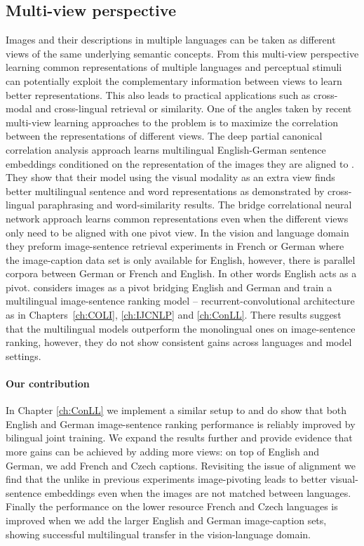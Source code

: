 \subsection{Multi-view perspective}
\label{sec:multiview}

Images and their descriptions in multiple languages can be taken as different views of the
same underlying semantic concepts. From this multi-view perspective learning common representations
of multiple languages and perceptual stimuli can potentially exploit the complementary information
between views to learn better representations. This also leads to practical applications such as
cross-modal and cross-lingual retrieval or similarity.
One of the angles taken by recent multi-view learning approaches to the problem
is to maximize the correlation between the representations of different views.
The deep partial canonical correlation
analysis approach learns multilingual English-German sentence embeddings conditioned on the
representation of the images they are aligned to \citep{rotman2018bridging}.
They show that their model using the visual modality as an extra view finds
better multilingual sentence and word representations as demonstrated by
cross-lingual paraphrasing and word-similarity results.
The bridge correlational neural network approach \citep{rajendran2015bridge}
learns common representations even when the different views only need to be
aligned with one pivot view. In the vision and language domain they preform
image-sentence retrieval experiments in French or German where
the image-caption data set is only available for English, however,
there is parallel corpora between German or French and English. In other words English acts as a pivot.
\cite{gella2017image} considers images as a pivot bridging English and German and train a multilingual
image-sentence ranking model -- recurrent-convolutional architecture as in Chapters~\ref{ch:COLI}, \ref{ch:IJCNLP} and \ref{ch:ConLL}.
There results suggest that the multilingual models outperform the monolingual ones on image-sentence
ranking, however, they do not show consistent gains across languages and model settings.

\paragraph{Our contribution}

In Chapter \ref{ch:ConLL} we implement a similar setup to \cite{gella2017image}
and do show that both English and German image-sentence
ranking performance is reliably improved by bilingual joint training.
We expand the results further and provide evidence that more gains can be
achieved by adding more views: on top of English and German, we
add French and Czech captions. Revisiting the issue of alignment we find that
the unlike in previous experiments \citep{gella2017image,calixto2017multilingual,rotman2018bridging}
image-pivoting leads to better visual-sentence embeddings even when the images
are not matched between languages. Finally the performance on the lower resource
French and Czech languages is improved when we add the larger
English and German image-caption sets, showing successful multilingual
transfer in the vision-language domain.

